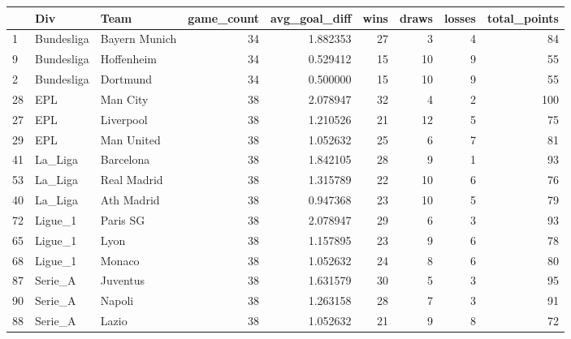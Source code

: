 \begin{tabular}{lllrrrrrr}
\toprule
{} &         Div &           Team &  game\_count &  avg\_goal\_diff &  wins &  draws &  losses &  total\_points \\
\midrule
1  &  Bundesliga &  Bayern Munich &          34 &       1.882353 &    27 &      3 &       4 &            84 \\
9  &  Bundesliga &     Hoffenheim &          34 &       0.529412 &    15 &     10 &       9 &            55 \\
2  &  Bundesliga &       Dortmund &          34 &       0.500000 &    15 &     10 &       9 &            55 \\
28 &         EPL &       Man City &          38 &       2.078947 &    32 &      4 &       2 &           100 \\
27 &         EPL &      Liverpool &          38 &       1.210526 &    21 &     12 &       5 &            75 \\
29 &         EPL &     Man United &          38 &       1.052632 &    25 &      6 &       7 &            81 \\
41 &     La\_Liga &      Barcelona &          38 &       1.842105 &    28 &      9 &       1 &            93 \\
53 &     La\_Liga &    Real Madrid &          38 &       1.315789 &    22 &     10 &       6 &            76 \\
40 &     La\_Liga &     Ath Madrid &          38 &       0.947368 &    23 &     10 &       5 &            79 \\
72 &     Ligue\_1 &       Paris SG &          38 &       2.078947 &    29 &      6 &       3 &            93 \\
65 &     Ligue\_1 &           Lyon &          38 &       1.157895 &    23 &      9 &       6 &            78 \\
68 &     Ligue\_1 &         Monaco &          38 &       1.052632 &    24 &      8 &       6 &            80 \\
87 &     Serie\_A &       Juventus &          38 &       1.631579 &    30 &      5 &       3 &            95 \\
90 &     Serie\_A &         Napoli &          38 &       1.263158 &    28 &      7 &       3 &            91 \\
88 &     Serie\_A &          Lazio &          38 &       1.052632 &    21 &      9 &       8 &            72 \\
\bottomrule
\end{tabular}
